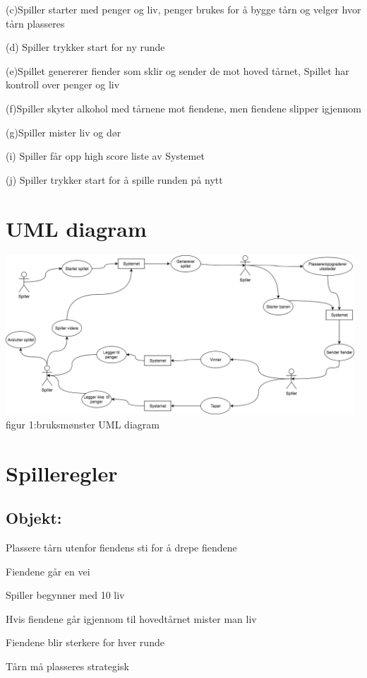 \documentclass[norsk,a4paper,12 pt]{article}
\begin{document}
(c)Spiller starter med penger og liv, penger brukes for å bygge tårn og velger hvor tårn plasseres

(d) Spiller trykker start for ny runde

(e)Spillet genererer fiender som sklir og sender de mot hoved tårnet, Spillet har kontroll over penger og liv

(f)Spiller skyter alkohol med tårnene mot fiendene, men fiendene slipper igjennom

(g)Spiller mister liv og dør 

(i) Spiller får opp high score liste av Systemet

(j) Spiller trykker start for å spille runden på nytt

\section{UML diagram}

\includegraphics[width=0.98\textwidth,height=0.5\textheight]{uml.png}
figur 1:bruksmønster UML diagram
\section{Spilleregler}

\subsection{Objekt:}


Plassere tårn utenfor fiendens sti for å drepe fiendene 

Fiendene går en vei

Spiller begynner med 10 liv

Hvis fiendene går igjennom til hovedtårnet mister man liv


Fiendene blir sterkere for hver runde

Tårn må plasseres strategisk
\end{document}
